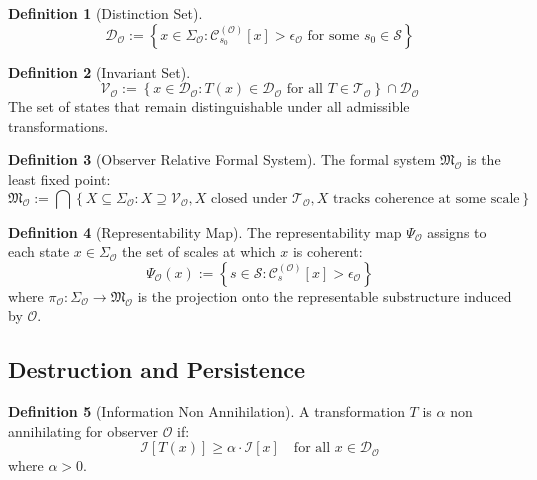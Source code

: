 \documentclass[12pt]{article}
\theoremstyle{definition}
\newtheorem{definition}{Definition}
\begin{document}
\begin{definition}[Distinction Set]
\begin{equation}
\mathcal{D}_{\mathcal{O}} := \left\{ x \in \Sigma_{\mathcal{O}} : \mathcal{C}_{s_0}^{(\mathcal{O})}[x] > \epsilon_{\mathcal{O}} \text{ for some } s_0 \in \mathcal{S} \right\}
\end{equation}
\end{definition}

\begin{definition}[Invariant Set]
\begin{equation}
\mathcal{V}_{\mathcal{O}} := \left\{ x \in \mathcal{D}_{\mathcal{O}} : T(x) \in \mathcal{D}_{\mathcal{O}} \text{ for all } T \in \mathcal{T}_{\mathcal{O}} \right\} \cap \mathcal{D}_{\mathcal{O}}
\end{equation}
The set of states that remain distinguishable under all admissible transformations.
\end{definition}

\begin{definition}[Observer Relative Formal System]
The formal system $\mathfrak{M}_{\mathcal{O}}$ is the least fixed point:
\begin{equation}
\mathfrak{M}_{\mathcal{O}} := \bigcap \left\{ X \subseteq \Sigma_{\mathcal{O}} : X \supseteq \mathcal{V}_{\mathcal{O}}, X \text{ closed under } \mathcal{T}_{\mathcal{O}}, X \text{ tracks coherence at some scale} \right\}
\end{equation}
\end{definition}

\begin{definition}[Representability Map]
The representability map $\Psi_{\mathcal{O}}$ assigns to each state $x \in \Sigma_{\mathcal{O}}$ the set of scales at which $x$ is coherent:
\begin{equation}
\Psi_{\mathcal{O}}(x) := \left\{ s \in \mathcal{S} : \mathcal{C}_s^{(\mathcal{O})}[x] > \epsilon_{\mathcal{O}} \right\}
\end{equation}
where $\pi_{\mathcal{O}} : \Sigma_{\mathcal{O}} \to \mathfrak{M}_{\mathcal{O}}$ is the projection onto the representable substructure induced by $\mathcal{O}$.
\end{definition}

\subsection{Destruction and Persistence}

\begin{definition}[Information Non Annihilation]
A transformation $T$ is $\alpha$ non annihilating for observer $\mathcal{O}$ if:
\begin{equation}
\mathcal{I}[T(x)] \geq \alpha \cdot \mathcal{I}[x] \quad \text{for all } x \in \mathcal{D}_{\mathcal{O}}
\end{equation}
where $\alpha > 0$.
\end{definition}
\end{document}
